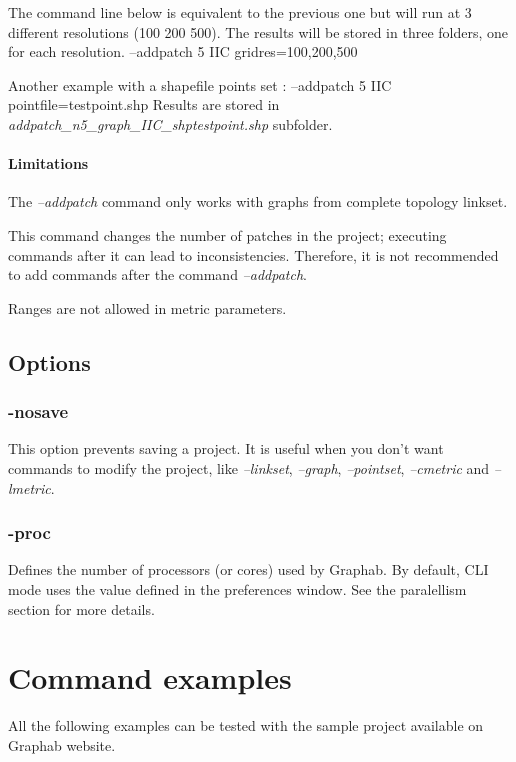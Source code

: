 \documentclass[a4paper,10pt]{report}
\newenvironment{cmd}
{\quote\Verbatim}
{\endVerbatim\endquote}
\begin{document}
The command line below is equivalent to the previous one but will run at 3 different resolutions (100 200 500). The results will be stored in three folders, one for each resolution.
\begin{cmd}
--addpatch 5 IIC gridres=100,200,500
\end{cmd}

Another example with a shapefile points set :
\begin{cmd}
--addpatch 5 IIC pointfile=testpoint.shp
\end{cmd}
Results are stored in \textit{addpatch\_n5\_graph\_IIC\_shptestpoint.shp} subfolder.

\subsubsection{Limitations}
The \textit{--addpatch} command only works with graphs from complete topology linkset.

This command changes the number of patches in the project; executing commands after it can lead to inconsistencies.
Therefore, it is not recommended to add commands after the command \textit{--addpatch}.


Ranges are not allowed in metric parameters.


\section{Options}
\subsection{-nosave}
This option prevents saving a project. It is useful when you don't want commands to modify the project, 
like \textit{--linkset}, \textit{--graph}, \textit{--pointset}, \textit{--cmetric} and \textit{--lmetric}.

\subsection{-proc}
Defines the number of processors (or cores) used by Graphab.
By default, CLI mode uses the value defined in the preferences window.
See the paralellism section for more details.


\chapter{Command examples}
All the following examples can be tested with the sample project available on Graphab website. 
\end{document}
